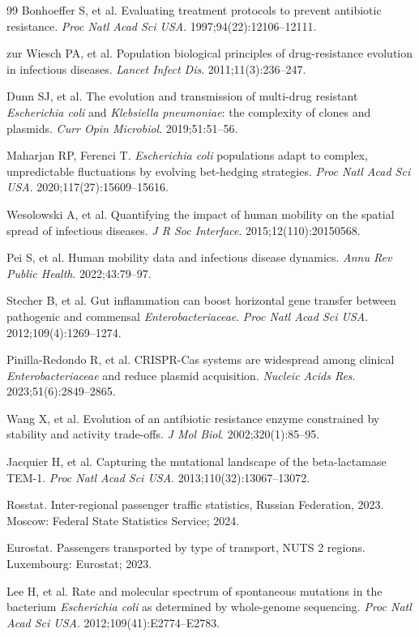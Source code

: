 \documentclass[12pt,a4paper]{article}
\begin{document}
\begin{thebibliography}{99}
Bonhoeffer S, et al.
Evaluating treatment protocols to prevent antibiotic resistance.
\textit{Proc Natl Acad Sci USA}. 1997;94(22):12106--12111.

zur Wiesch PA, et al.
Population biological principles of drug-resistance evolution in infectious diseases.
\textit{Lancet Infect Dis}. 2011;11(3):236--247.

Dunn SJ, et al.
The evolution and transmission of multi-drug resistant \textit{Escherichia coli} and \textit{Klebsiella pneumoniae}: the complexity of clones and plasmids.
\textit{Curr Opin Microbiol}. 2019;51:51--56.

Maharjan RP, Ferenci T.
\textit{Escherichia coli} populations adapt to complex, unpredictable fluctuations by evolving bet-hedging strategies.
\textit{Proc Natl Acad Sci USA}. 2020;117(27):15609--15616.

Wesolowski A, et al.
Quantifying the impact of human mobility on the spatial spread of infectious diseases.
\textit{J R Soc Interface}. 2015;12(110):20150568.

Pei S, et al.
Human mobility data and infectious disease dynamics.
\textit{Annu Rev Public Health}. 2022;43:79--97.

Stecher B, et al.
Gut inflammation can boost horizontal gene transfer between pathogenic and commensal \textit{Enterobacteriaceae}.
\textit{Proc Natl Acad Sci USA}. 2012;109(4):1269--1274.

Pinilla-Redondo R, et al.
CRISPR-Cas systems are widespread among clinical \textit{Enterobacteriaceae} and reduce plasmid acquisition.
\textit{Nucleic Acids Res}. 2023;51(6):2849--2865.

Wang X, et al.
Evolution of an antibiotic resistance enzyme constrained by stability and activity trade-offs.
\textit{J Mol Biol}. 2002;320(1):85--95.

Jacquier H, et al.
Capturing the mutational landscape of the beta-lactamase TEM-1.
\textit{Proc Natl Acad Sci USA}. 2013;110(32):13067--13072.

Rosstat.
Inter-regional passenger traffic statistics, Russian Federation, 2023.
Moscow: Federal State Statistics Service; 2024.

Eurostat.
Passengers transported by type of transport, NUTS 2 regions.
Luxembourg: Eurostat; 2023.

Lee H, et al.
Rate and molecular spectrum of spontaneous mutations in the bacterium \textit{Escherichia coli} as determined by whole-genome sequencing.
\textit{Proc Natl Acad Sci USA}. 2012;109(41):E2774--E2783.

\end{thebibliography}
\end{document}
